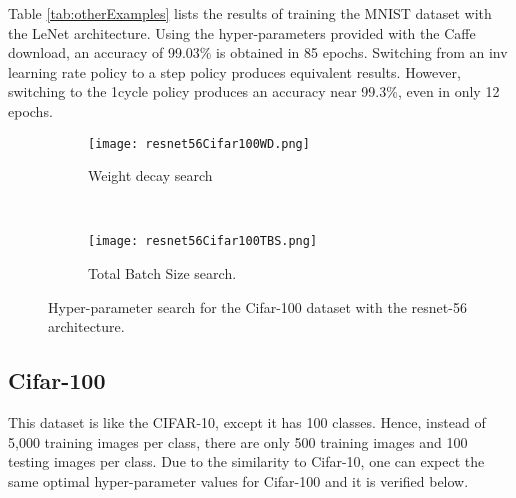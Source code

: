 \documentclass{article} %
\begin{document}
Table \ref{tab:otherExamples} lists the results of training the MNIST dataset with the LeNet architecture.  Using the hyper-parameters provided with the Caffe download, an accuracy of 99.03\% is obtained in 85 epochs.  Switching from an inv learning rate policy to a step policy produces equivalent results.  However, switching to the 1cycle policy produces an accuracy near 99.3\%, even in only 12 epochs.  

\begin{figure}[tbh]
	\centering
	\begin{subfigure}[b]{0.47\textwidth}
		\texttt{[image: resnet56Cifar100WD.png]}
		\caption{Weight decay search}
		\label{fig:resnet56Cifar100WD}       %
	\end{subfigure}
	\quad
	\hfill
	~ %
	\centering
	\begin{subfigure}[b]{0.46\textwidth}
		\texttt{[image: resnet56Cifar100TBS.png]}
		\caption{Total Batch Size search.}
		\label{fig:resnet56Cifar100TBS}       %
	\end{subfigure}
	\caption{Hyper-parameter search for the Cifar-100 dataset with the resnet-56 architecture.}
	\label{fig:resnet56Cifar100}
	\vspace{-5pt}	
\end{figure}


\subsection{Cifar-100}
\label{sec:cifar100}

This dataset is like the CIFAR-10, except it has 100 classes. Hence, instead of 5,000 training images per class, there are only 500 training images and 100 testing images per class.   Due to the similarity to Cifar-10, one can expect the same optimal hyper-parameter values for Cifar-100 and it is verified below.  

\end{document}
